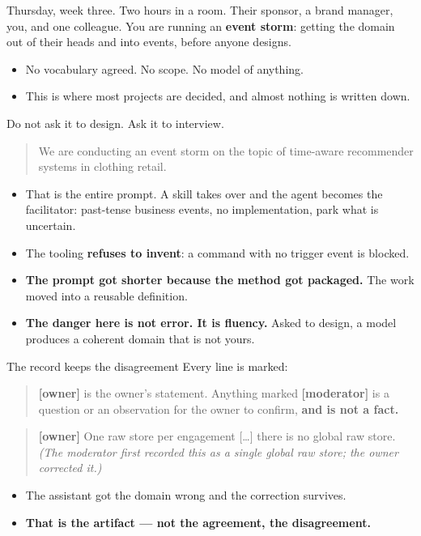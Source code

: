 \documentclass[aspectratio=169,t]{beamer}
\begin{document}
\begin{frame}{Thursday, week three. Two hours in a room.}
    Their sponsor, a brand manager, you, and one colleague. You are running an
    \textbf{event storm}: getting the domain out of their heads and into events,
    before anyone designs.
    \begin{itemize}
        \item No vocabulary agreed. No scope. No model of anything.
        \item This is where most projects are decided, and almost nothing is
              written down.
    \end{itemize}
\end{frame}

\begin{frame}{Do not ask it to design. Ask it to interview.}
    \begin{quote}\small
        We are conducting an event storm on the topic of time-aware recommender
        systems in clothing retail.
    \end{quote}
    \begin{itemize}
        \item That is the entire prompt. A skill takes over and the agent becomes
              the facilitator: past-tense business events, no implementation, park
              what is uncertain.
        \item The tooling \textbf{refuses to invent}: a command with no trigger
              event is blocked.
        \item \textbf{The prompt got shorter because the method got packaged.}
              The work moved into a reusable definition.
        \item \textbf{The danger here is not error. It is fluency.} Asked to
              design, a model produces a coherent domain that is not yours.
    \end{itemize}
\end{frame}

\begin{frame}{The record keeps the disagreement}
    Every line is marked:
    \begin{quote}\small
        \textbf{[owner]} is the owner's statement. Anything marked
        \textbf{[moderator]} is a question or an observation for the owner to
        confirm, \textbf{and is not a fact.}
    \end{quote}
    \begin{quote}\small
        \textbf{[owner]} One raw store per engagement [\ldots] there is no global
        raw store. \emph{(The moderator first recorded this as a single global raw
        store; the owner corrected it.)}
    \end{quote}
    \begin{itemize}
        \item The assistant got the domain wrong and the correction survives.
        \item \textbf{That is the artifact --- not the agreement, the disagreement.}
    \end{itemize}
\end{frame}
\end{document}
